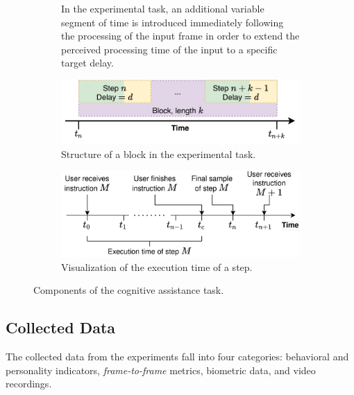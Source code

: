 \documentclass[10pt,letterpaper]{article}
\providecommand{\DIFaddtex}[1]{#1} %
\providecommand{\DIFaddbegin}{\protect\color{blue}} %
\providecommand{\DIFaddend}{\protect\color{black}} %
\providecommand{\DIFdelbegin}{\protect\color{red}} %
\providecommand{\DIFdelend}{\protect\color{black}} %
\providecommand{\DIFaddFL}[1]{\DIFadd{#1}} %
\providecommand{\DIFaddbeginFL}{} %
\providecommand{\DIFaddendFL}{} %
\providecommand{\DIFadd}[1]{\texorpdfstring{\DIFaddtex{#1}}{#1}} %
\newcommand{\DIFscaledelfig}{0.5}
\newlength{\DIFdelgraphicswidth} %
\newlength{\DIFdelgraphicsheight} %
\newcommand{\DIFaddincludegraphics}[2][]{{\color{blue}\fbox{\DIFOincludegraphics[#1]{#2}}}} %
\newcommand{\DIFdelincludegraphics}[2][]{%
\sbox{\DIFdelgraphicsbox}{\DIFOincludegraphics[#1]{#2}}%
\settoboxwidth{\DIFdelgraphicswidth}{\DIFdelgraphicsbox} %
\settoboxtotalheight{\DIFdelgraphicsheight}{\DIFdelgraphicsbox} %
\scalebox{\DIFscaledelfig}{%
\parbox[b]{\DIFdelgraphicswidth}{\usebox{\DIFdelgraphicsbox}\\[-\baselineskip] \rule{\DIFdelgraphicswidth}{0em}}\llap{\resizebox{\DIFdelgraphicswidth}{\DIFdelgraphicsheight}{%
\setlength{\unitlength}{\DIFdelgraphicswidth}%
\begin{picture}(1,1)%
\thicklines\linethickness{2pt} %
{\color[rgb]{1,0,0}\put(0,0){\framebox(1,1){}}}%
{\color[rgb]{1,0,0}\put(0,0){\line( 1,1){1}}}%
{\color[rgb]{1,0,0}\put(0,1){\line(1,-1){1}}}%
\end{picture}%
}\hspace*{3pt}}} %
} %
\DeclareRobustCommand{\DIFaddbegin}{\DIFOaddbegin \let\includegraphics\DIFaddincludegraphics} %
\DeclareRobustCommand{\DIFaddend}{\DIFOaddend \let\includegraphics\DIFOincludegraphics} %
\DeclareRobustCommand{\DIFdelbegin}{\DIFOdelbegin \let\includegraphics\DIFdelincludegraphics} %
\DeclareRobustCommand{\DIFdelend}{\DIFOaddend \let\includegraphics\DIFOincludegraphics} %
\DeclareRobustCommand{\DIFaddbeginFL}{\DIFOaddbeginFL \let\includegraphics\DIFaddincludegraphics} %
\DeclareRobustCommand{\DIFaddendFL}{\DIFOaddendFL \let\includegraphics\DIFOincludegraphics} %
\begin{document}
\begin{figure}[h]
\begin{subfigure}[t]{.49\textwidth}
    \caption{\DIFaddFL{In the experimental task, an additional variable segment of time is introduced immediately following the processing of the input frame in order to extend the perceived processing time of the input to a specific target delay.}}%
    \label{fig:cogassist:step:delay}
  \end{subfigure}
  \medskip%
  \begin{subfigure}[t]{.49\textwidth}
    \centering
    \includegraphics[width=\textwidth]{images/block.pdf}
    \caption{\DIFaddFL{Structure of a block in the experimental task.}}%
    \label{fig:cogassist:block}
  \end{subfigure}%
  \hfill%
  \begin{subfigure}[t]{.49\textwidth}
    \centering
    \includegraphics[width=\textwidth]{images/exec_time_diagram.pdf}
    \DIFaddendFL \caption{\DIFaddbegin \DIFadd{Visualization of the execution time of a step.} \DIFaddend}%
    \label{fig:exectime:diagram}
  \DIFaddbeginFL \end{subfigure}%
  \caption{\DIFaddFL{Components of the cognitive assistance task.}}
\DIFaddendFL \end{figure}

\DIFdelbegin %

\DIFdelend \subsection{Collected Data}

The collected data from the experiments fall into four categories: behavioral and personality indicators, \emph{frame-to-frame} metrics, biometric data, and video recordings.
\end{document}
